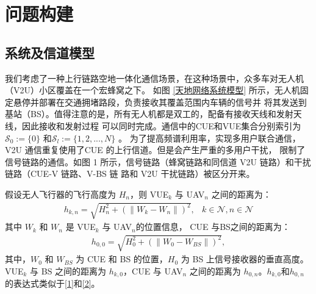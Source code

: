 \section{问题构建}\label{section2-2}
\subsection{系统及信道模型}\label{section2-2-1}
我们考虑了一种上行链路空地一体化通信场景，在这种场景中，众多车对无人机（V2U）小区覆盖在一个宏蜂窝之下。
如图 \ref{天地网络系统模型} 所示，无人机固定悬停并部署在交通拥堵路段，负责接收其覆盖范围内车辆的信号并
将其发送到基站（BS）。值得注意的是，所有无人机都是双工的，配备有接收天线和发射天线，因此接收和发射过程
可以同时完成。通信中的CUE和VUE集合分别索引为$\mathcal{S}_0:= \{0\}$ 和$\mathcal{S}_l:=\{1, 2,..., N\}$ 。
为了提高频谱利用率，实现多用户联合通信，V2U 通信重复使用了CUE 的上行信道。但是会产生严重的多用户干扰，
限制了信号链路的通信。如图 1 所示，信号链路（蜂窝链路和同信道 V2U 链路）和干扰链路（CUE-V 链路、V-BS 链
路和 V2U 干扰链路）被区分开来。

假设无人飞行器的飞行高度为 $H_n$，则 VUE$_{k}$ 与 UAV$_{n}$ 之间的距离为：
\begin{eqnarray}\label{1}
h_{k,n}=\sqrt{H_n^2+(\|W_k-W_n\|)^2},           &k\in \mathcal{N}, n\in \mathcal{N}
\end{eqnarray}
其中 $W_k$ 和 $W_n$ 是 VUE$_{k}$ 与 UAV$_{n}$的位置信息，  CUE 与BS之间的距离为：
\begin{eqnarray}\label{2}
h_{0,0}=\sqrt{H_0^2+(\|W_0-W_{BS}\|)^2},
\end{eqnarray}
其中，$W_0$ 和 $W_{BS}$ 为 CUE 和 BS 的位置，$H_0$ 为 BS 上信号接收器的垂直高度。VUE$_{k}$ 与 BS 之间的距离为 $h_{k,0}$，CUE 与 UAV$_{n}$ 之间的距离为 $h_{0,n}$。$h_{k,0}$和$h_{0,n}$的表达式类似于\eqref{1}和\eqref{2}。

